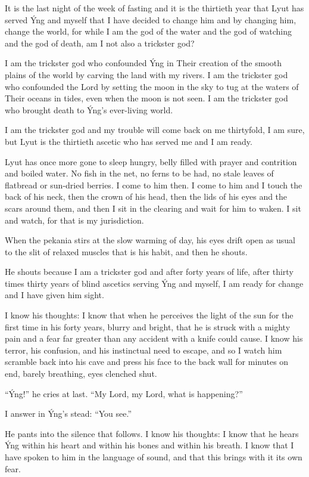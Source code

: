 \secdiv

\noindent It is the last night of the week of fasting and it is the thirtieth year that Lyut has served Ýng and myself that I have decided to change him and by changing him, change the world, for while I am the god of the water and the god of watching and the god of death, am I not also a trickster god?

I am the trickster god who confounded Ýng in Their creation of the smooth plains of the world by carving the land with my rivers. I am the trickster god who confounded the Lord by setting the moon in the sky to tug at the waters of Their oceans in tides, even when the moon is not seen. I am the trickster god who brought death to Ýng's ever-living world.

I am the trickster god and my trouble will come back on me thirtyfold, I am sure, but Lyut is the thirtieth ascetic who has served me and I am ready.

Lyut has once more gone to sleep hungry, belly filled with prayer and contrition and boiled water. No fish in the net, no ferns to be had, no stale leaves of flatbread or sun-dried berries. I come to him then. I come to him and I touch the back of his neck, then the crown of his head, then the lids of his eyes and the scars around them, and then I sit in the clearing and wait for him to waken. I sit and watch, for that is my jurisdiction.

When the pekania stirs at the slow warming of day, his eyes drift open as usual to the slit of relaxed muscles that is his habit, and then he shouts.

He shouts because I am a trickster god and after forty years of life, after thirty times thirty years of blind ascetics serving Ýng and myself, I am ready for change and I have given him sight.

I know his thoughts: I know that when he perceives the light of the sun for the first time in his forty years, blurry and bright, that he is struck with a mighty pain and a fear far greater than any accident with a knife could cause. I know his terror, his confusion, and his instinctual need to escape, and so I watch him scramble back into his cave and press his face to the back wall for minutes on end, barely breathing, eyes clenched shut.

``Ýng!'' he cries at last. ``My Lord, my Lord, what is happening?''

I answer in Ýng's stead: ``You see.''

He pants into the silence that follows. I know his thoughts: I know that he hears Ýng within his heart and within his bones and within his breath. I know that I have spoken to him in the language of sound, and that this brings with it its own fear.


